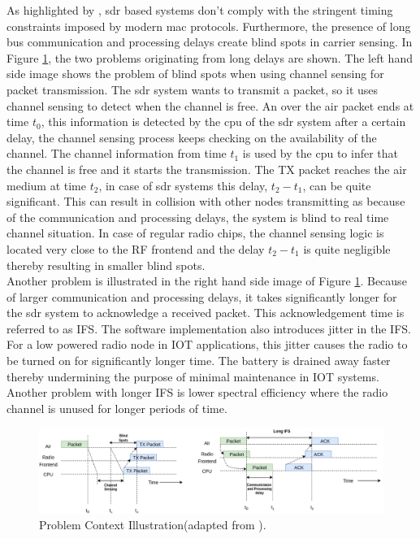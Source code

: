 As highlighted by \cite{schmid_experimental_2007}, \ac{sdr} based systems don't comply with the stringent timing constraints imposed by modern \ac{mac} protocols. Furthermore, the presence of long bus communication and processing delays create blind spots \cite{schmid_experimental_2007} in carrier sensing. 
In Figure \ref{blind_spots}, the two problems originating from long delays are shown.
The left hand side image shows the problem of blind spots when using channel sensing for packet transmission.
The \ac{sdr} system wants to transmit a packet, so it uses channel sensing to detect when the channel is free.
An over the air packet ends at time $t_0$, this information is detected by the \ac{cpu} of the \ac{sdr} system after a certain delay, the channel sensing process keeps checking on the availability of the channel.
The channel information from time $t_1$ is used by the \ac{cpu} to infer that the channel is free and it starts the transmission.
The TX packet reaches the air medium at time $t_2$, in case of \ac{sdr} systems this delay, $t_2-t_1$, can be quite significant.
This can result in collision with other nodes transmitting as because of the communication and processing delays, the system is blind to real time channel situation.
In case of regular radio chips, the channel sensing logic is located very close to the \ac{RF} frontend and the delay $t_2 - t_1$ is quite negligible thereby resulting in smaller blind spots.\\

Another problem is illustrated in the right hand side image of Figure \ref{blind_spots}.
Because of larger communication and processing delays, it takes significantly longer for the \ac{sdr} system to acknowledge a received packet.
This acknowledgement time is referred to as \ac{IFS}.
The software implementation also introduces jitter in the {IFS}.
For a low powered radio node in \ac{IOT} applications, this jitter causes the radio to be turned on for significantly longer time.
The battery is drained away faster thereby undermining the purpose of minimal maintenance in \ac{IOT} systems.
Another problem with longer \ac{IFS} is lower spectral efficiency where the radio channel is unused for longer periods of time.\\ 

\begin{figure}[!h]
\centering
\includegraphics[width=\textwidth]{Figure/BlindSpots.png}
\caption{Problem Context Illustration(adapted from \cite{schmid_experimental_2007}).}
\label{blind_spots}
\end{figure}

